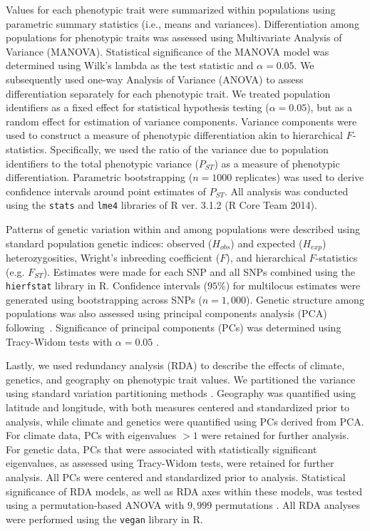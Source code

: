 \documentclass[smallextended]{svjour3}
\begin{document}
Values for each phenotypic trait were summarized  within populations using
parametric summary statistics (i.e., means and variances). Differentiation
among
populations for phenotypic traits was assessed using Multivariate Analysis of
Variance (MANOVA). Statistical significance of the MANOVA model was determined
using Wilk's lambda as the test statistic and $\alpha = 0.05$. We subsequently
used one-way Analysis of Variance (ANOVA) to assess differentiation separately
for each phenotypic trait. We treated population identifiers as a fixed effect
for statistical hypothesis testing ($\alpha = 0.05$), but as a random effect
for
estimation of variance components. Variance components were used to construct a
measure of phenotypic differentiation akin to hierarchical $F$-statistics.
Specifically, we used the ratio of the variance due to population identifiers
to
the total phenotypic variance ($P_{ST}$) as a measure of phenotypic
differentiation. Parametric bootstrapping ($n = 1000$ replicates) was used
to derive confidence intervals around point estimates of $P_{ST}$. All analysis
was conducted using the \texttt{stats} and
\texttt{lme4} libraries of R ver. 3.1.2 (R Core Team 2014).

Patterns of genetic variation within and among populations were described using
standard population genetic indices: observed ($H_{obs}$) and expected
($H_{exp}$) heterozygosities, Wright's inbreeding coefficient ($F$), and
hierarchical $F$-statistics (e.g. $F_{ST}$). Estimates were made for each SNP
and all SNPs combined using the \texttt{hierfstat} library in R. Confidence
intervals ($95\%$) for multilocus estimates were generated using bootstrapping
across SNPs ($n = 1,000$). Genetic structure among populations was also
assessed
using principal components analysis (PCA) following~\cite{Patterson:2006}.
Significance of principal components (PCs) was determined using Tracy-Widom
tests with $\alpha = 0.05$ \citep{Patterson:2006}.

Lastly, we used redundancy analysis (RDA) to describe the effects of climate,
genetics, and geography on phenotypic trait values. We partitioned the variance
using standard variation partitioning methods \citep{Borcard:1992, Liu:1997}.
Geography was quantified using latitude and longitude, with both measures
centered and standardized prior to analysis, while climate and genetics were
quantified using PCs derived from PCA. For climate data, PCs with eigenvalues
$> 1$ were retained for further analysis. For genetic data, PCs that were
associated with statistically significant eigenvalues, as assessed using
Tracy-Widom tests, were retained for further analysis. All PCs were
centered and standardized prior to analysis. Statistical significance
of RDA models, as well as RDA axes within these models, was tested using
a permutation-based ANOVA with $9,999$ permutations \citep{Legendre:2011}. All
RDA analyses were performed using the \texttt{vegan} library in R. 
\end{document}
